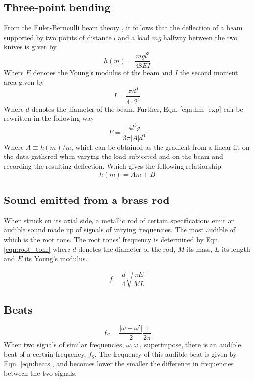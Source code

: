 \documentclass[11pt,a4paper]{article}
\begin{document}
  \subsection{Three-point bending}
  From the Euler-Bernoulli beam theory \cite{3pt}, it follows that the deflection of a beam supported by two points of distance $l$ and a load $mg$ halfway between the two knives is given by
  \begin{equation}
    h(m) = \frac{mgl^3}{48EI}
    \label{eqn:hm_exp}
  \end{equation}
  Where $E$ denotes the Young's modulus \cite{ymodul} of the beam and $I$ the second moment area given by 
  \begin{equation}
    I = \frac{\pi d^4}{4\cdot 2^4}
  \end{equation}
  Where $d$ denotes the diameter of the beam.
  \newline
  Further, Eqn. \ref{eqn:hm_exp} can be rewritten in the following way
  \begin{equation}
    E = \frac{4l^3g}{3\pi |A|d^4}
    \label{eqn:E_deflection}
  \end{equation}
  Where $A \equiv h(m)/m$, which can be obtained as the gradient from a linear fit on the data gathered when varying the load subjected and on the beam and recording the resulting deflection. Which gives the following relationship
  \begin{equation}
    h(m) = Am + B
  \end{equation}
  
  \subsection{Sound emitted from a brass rod}

  When struck on its axial side, a metallic rod of certain specifications emit an audible sound made up of signals of varying frequencies. The most audible of which is the root tone. The root tones' frequency is determined by Eqn. \ref{eqn:root_tone} where $d$ denotes the diameter of the rod, $M$ its mass, $L$ its length and $E$ its Young's modulus.

  \begin{equation}
    f = \frac{d}{4}\sqrt{\frac{\pi E}{M L}}
    \label{eqn:root_tone}
  \end{equation}

  \subsection{Beats}
    \begin{equation}
      f_S = \frac{|\omega - \omega'|}{2}\frac{1}{2\pi}
      \label{eqn:beats}
    \end{equation}
    When two signals of similar frequencies, $\omega, \omega'$, superimpose, there is an audible beat of a certain frequency, $f_S$. The frequency of this audible beat is given by Eqn. \ref{eqn:beats}, and becomes lower the smaller the difference in frequencies between the two signals.
\end{document}
